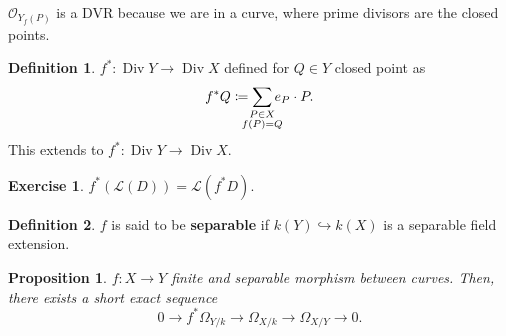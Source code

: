 \documentclass[12pt]{article}
\DeclareMathOperator{\Div}{Div}
\newtheorem*{proposition}{Proposition}
\theoremstyle{definition}
\newtheorem*{definition}{Definition}
\newtheorem*{exercise}{Exercise}
\begin{document}
$\mathcal{O}_{Y_f(P)}$ is a DVR because we are in a curve, where prime divisors are the closed points.

\begin{definition}
$f^*:\Div Y\longrightarrow\Div X$ defined for $Q\in Y$ closed point as
\[f^*Q\coloneqq\sum_{\mathclap{\substack{P\in X\\f(P)=Q}}}e_P\cdot P.\]
This extends to $f^*:\Div Y\rightarrow\Div X$.
\end{definition}

\begin{exercise}
$f^*(\mathcal{L}(D))=\mathcal{L}(f^*D)$.
\end{exercise}

\begin{definition}
$f$ is said to be \textbf{separable} if $k(Y)\hookrightarrow k(X)$ is a separable field extension.
\end{definition}

\begin{proposition}
$f:X\rightarrow Y$ finite and separable morphism between curves. Then, there exists a short exact sequence
\[0\longrightarrow f^*\Omega_{Y/k}\longrightarrow\Omega_{X/k}\longrightarrow\Omega_{X/Y}\rightarrow0.\]
\end{proposition}
\end{document}
